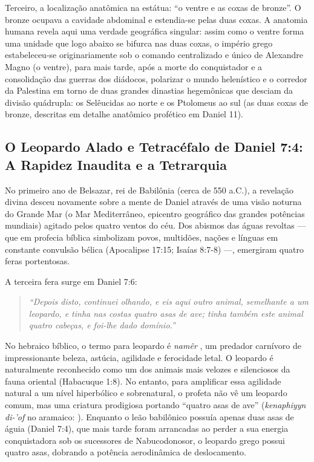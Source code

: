 \documentclass[11pt,a4paper,openany]{book}
\begin{document}
Terceiro, a localização anatômica na estátua: ``o ventre e as coxas de bronze''. O bronze ocupava a cavidade abdominal e estendia-se pelas duas coxas. A anatomia humana revela aqui uma verdade geográfica singular: assim como o ventre forma uma unidade que logo abaixo se bifurca nas duas coxas, o império grego estabeleceu-se originariamente sob o comando centralizado e único de Alexandre Magno (o ventre), para mais tarde, após a morte do conquistador e a consolidação das guerras dos diádocos, polarizar o mundo helenístico e o corredor da Palestina em torno de duas grandes dinastias hegemônicas que desciam da divisão quádrupla: os Selêucidas ao norte e os Ptolomeus ao sul (as duas coxas de bronze, descritas em detalhe anatômico profético em Daniel 11).


\subsection{O Leopardo Alado e Tetracéfalo de Daniel 7:4: A Rapidez Inaudita e a Tetrarquia}


No primeiro ano de Belsazar, rei de Babilônia (cerca de 550 a.C.), a revelação divina desceu novamente sobre a mente de Daniel através de uma visão noturna do Grande Mar (o Mar Mediterrâneo, epicentro geográfico das grandes potências mundiais) agitado pelos quatro ventos do céu. Dos abismos das águas revoltas — que em profecia bíblica simbolizam povos, multidões, nações e línguas em constante convulsão bélica (Apocalipse 17:15; Isaías 8:7-8) —, emergiram quatro feras portentosas.

A terceira fera surge em Daniel 7:6:

\begin{quote}
\itshape ``Depois disto, continuei olhando, e eis aqui outro animal, semelhante a um leopardo, e tinha nas costas quatro asas de ave; tinha também este animal quatro cabeças, e foi-lhe dado domínio.''
\end{quote}


No hebraico bíblico, o termo para leopardo é \textit{namêr} , um predador carnívoro de impressionante beleza, astúcia, agilidade e ferocidade letal. O leopardo é naturalmente reconhecido como um dos animais mais velozes e silenciosos da fauna oriental (Habacuque 1:8). No entanto, para amplificar essa agilidade natural a um nível hiperbólico e sobrenatural, o profeta não vê um leopardo comum, mas uma criatura prodigiosa portando ``quatro asas de ave'' (\textit{kenaphiyyn di-'of} no aramaico: ). Enquanto o leão babilônico possuía apenas duas asas de águia (Daniel 7:4), que mais tarde foram arrancadas ao perder a sua energia conquistadora sob os sucessores de Nabucodonosor, o leopardo grego possui quatro asas, dobrando a potência aerodinâmica de deslocamento.
\end{document}
